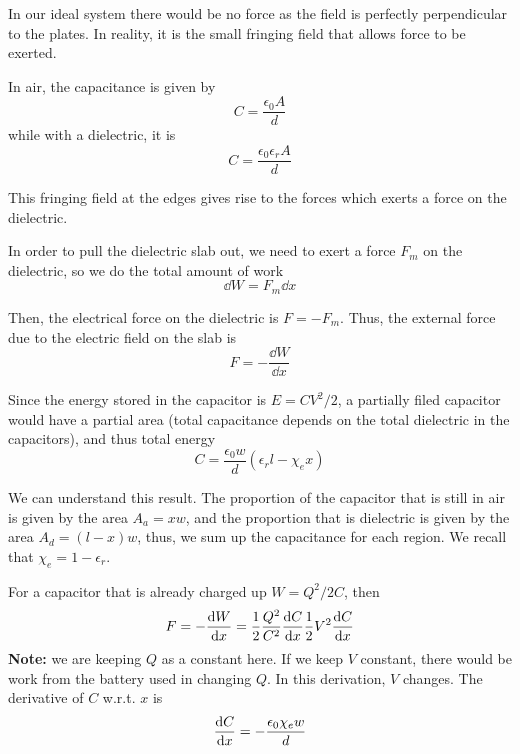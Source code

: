 \documentclass[12pt,chapterprefix=false,dvipsnames]{scrbook}
\theoremstyle{dotless}
\theoremstyle{definition}
\begin{document}
In our ideal system there would be no force as the field is
perfectly perpendicular to the plates. In reality, it is the
small fringing field that allows force to be exerted.

In air, the capacitance is given by
\begin{equation}
	C = \frac{\epsilon_{0}A}{d}
\end{equation}
while with a dielectric, it is
\begin{equation}
	C = \frac{\epsilon_{0}\epsilon_r A}{d}
\end{equation}

This fringing field at the edges gives rise to the forces which
exerts a force on the dielectric.

In order to pull the dielectric slab out, we need to exert a
force $F_m$ on the dielectric, so we do the
total amount of work
\begin{equation}
	\dd{W}
	=
	F_m \dd{x}
\end{equation}

Then, the electrical force on the dielectric is
$F = -F_m$. Thus, the external force due to the
electric field on the slab is
\begin{equation}
	F = -\frac{\dd{W}}{\dd{x}}
\end{equation}

Since the energy stored in the capacitor is
$E = CV^2/2$, a partially filed capacitor would have
a partial area (total capacitance depends on the total
dielectric in the capacitors), and thus total energy
\begin{equation}
	C = \frac{\epsilon_{0} w}{d}\left(\epsilon_r l - \chi_e x\right)
\end{equation}

We can understand this result. The proportion of the capacitor
that is still in air is given by the area
$A_a = xw$, and the proportion that is dielectric
is given by the area $A_d = \left(l - x\right)w$, thus, we sum up
the capacitance for each region. We recall that
$\chi_e = 1 - \epsilon_r$.

For a capacitor that is already charged up
$W = Q^2/2C$, then
\begin{equation}
	F = -\dv{W}{x} =
	\frac{1}{2}\frac{Q^2}{C^2}\dv{C}{x}\frac{1}{2}V^2\dv{C}{x}
\end{equation}
\textbf{Note:} we are keeping $Q$
as a constant here. If we keep $V$ constant,
there would be work from the battery used in changing
$Q$. In this derivation,
$V$ changes. The derivative of
$C$ w.r.t. $x$ is
\begin{equation}
	\dv{C}{x} =
	-\frac{\epsilon_{0} \chi_e w}{d}
\end{equation}
\end{document}
